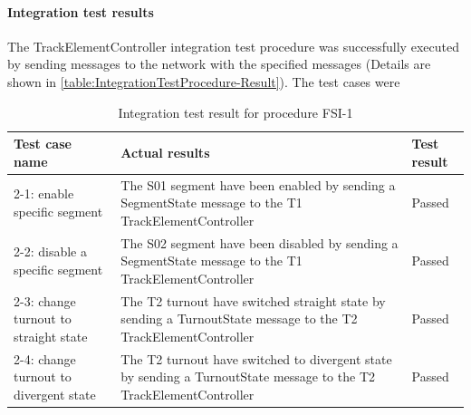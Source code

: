 \paragraph{Integration test results} The TrackElementController integration test procedure was successfully executed by sending messages to the network with the specified messages (Details are shown in \autoref{table:IntegrationTestProcedure-Result}). The test cases were 
\begin{table}[H]
	\caption{Integration test result for procedure FSI-1}
	\label{table:IntegrationTestProcedure-Result}
	\begin{center}
		\renewcommand{\arraystretch}{1.8}
		\begin{tabu} 
			to 0.9 \textwidth
			{  X[1.5, c] X[2.5, l] X[c]  }
			\toprule
			Test case name                         & Actual results                                                                                                     & Test result \\ -1: enable specific segment           & The S01 segment have been enabled by sending a SegmentState message to the T1 TrackElementController               & Passed      \\
			2-2: disable a specific segment        & The S02 segment have been disabled by sending a SegmentState message to the T1 TrackElementController              & Passed      \\
			2-3: change turnout to straight state  & The T2 turnout have switched straight state by sending a TurnoutState message to the T2 TrackElementController     & Passed      \\
			2-4: change turnout to divergent state & The T2 turnout have switched to divergent state by sending a TurnoutState message to the T2 TrackElementController & Passed      \\ \bottomrule
		\end{tabu}
	\end{center}
\end{table}

